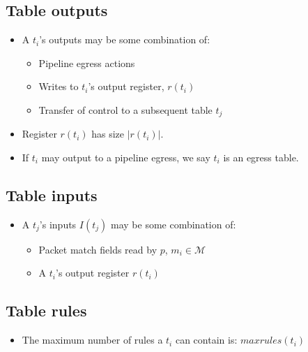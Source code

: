 \documentclass[12pt]{article}
\begin{document}
\subsection{Table outputs}
\begin{itemize}
  \item A $t_i$'s outputs may be some combination of:
  \begin{itemize}
      \item Pipeline egress actions
      \item Writes to $t_i$'s output register, $r(t_i)$
      \item Transfer of control to a subsequent table $t_j$
  \end{itemize}
  \item Register $r(t_i)$ has size $|r(t_i)|$.
  \item If $t_i$ may output to a pipeline egress, we say $t_i$ is an egress table.
\end{itemize}


\subsection{Table inputs}
\begin{itemize}
  \item A $t_j$'s inputs $I(t_j)$ may be some combination of:
  \begin{itemize}
      \item Packet match fields read by $p$, $m_i \in \mathcal{M}$
      \item A $t_i$'s output register $r(t_i)$
  \end{itemize}
\end{itemize}

\subsection{Table rules}
\begin{itemize}
  \item The maximum number of rules a $t_i$ can contain is: $maxrules(t_i)$
\end{itemize}
\end{document}
